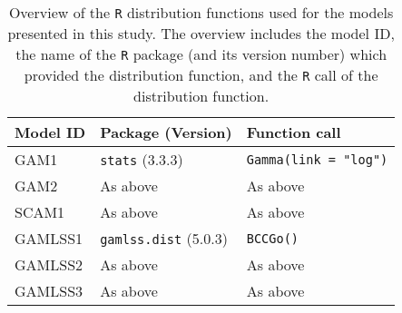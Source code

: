 \begin{table}[H]
  {\tabulinesep=2mm
    \begin{longtabu}{l l L}
      \caption{Overview of the \texttt{R} distribution functions used for the models presented in this study.  The overview includes
        the model ID,
        the name of the \texttt{R} package (and its version number) which provided the distribution function,
        and the \texttt{R} call of the distribution function.
        \label{tab:PresentedModelsOverviewDistributions}} \\
      \toprule
      Model ID & Package (Version) & Function call \\
      \midrule
      \endhead
      \bottomrule
      \endlastfoot
      GAM1 & \texttt{stats} (3.3.3) & \texttt{Gamma(link = "log")} \\
      GAM2 & As above & As above \\
      SCAM1 & As above & As above \\
      GAMLSS1 & \texttt{gamlss.dist} (5.0.3) & \texttt{BCCGo()} \\
      GAMLSS2 & As above & As above \\
      GAMLSS3 & As above & As above \\
      \bottomrule
    \end{longtabu}}
\end{table}

